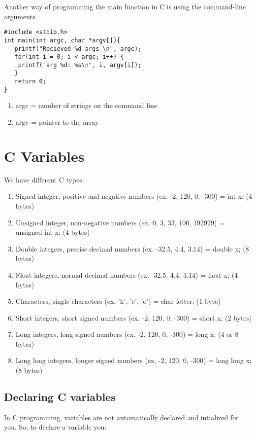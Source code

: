 \documentclass{article}
\begin{document}
Another way of programming the main function in C is using the command-line arguments. \\

\begin{verbatim}
#include <stdio.h>
int main(int argc, char *argv[]){
   printf("Recieved %d args \n", argc);
   for(int i = 0; i < argc; i++) {
	printf("arg %d: %s\n", i, argv[i]);
   }
   return 0;
}
\end{verbatim}

\begin{enumerate}
\item argc = number of strings on the command line
\item argv = pointer to the array
\end{enumerate} 

\section{C Variables}
We have different C types:

\begin{enumerate}
\item Signed integer, positive and negative numbers (ex. -2, 120, 0, -300) = int x; (4 bytes)
\item Unsigned integer, non-negative numbers (ex. 0, 3, 33, 100, 192929) = unsigned int x; (4 bytes)
\item Double integers, precise decimal numbers (ex. -32.5, 4.4, 3.14) = double x; (8 bytes)
\item Float integers, normal decimal numbers (ex. -32.5, 4.4, 3.14) = float x; (4 bytes)
\item Characters, single characters (ex. 'h', 'e', 'o') = char letter; (1 byte)
\item Short integers, short signed numbers (ex. -2, 120, 0, -300) = short x; (2 bytes)
\item Long integers, long signed numbers (ex. -2, 120, 0, -300) = long x; (4 or 8 bytes)
\item Long long integers, longer signed numbers (ex. -2, 120, 0, -300) = long long x; (8 bytes)
\end{enumerate}


\subsection*{Declaring C variables}
In C programming, variables are not automatically declared and intialized for you. So, to declare a variable you: 
\end{document}
